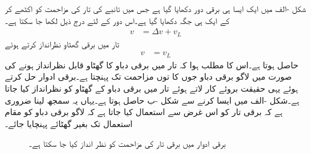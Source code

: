 شکل -الف میں ایک ایسا ہی برقی دور دکھایا گیا ہے جس  میں تانبے کی تار کی مزاحمت کو اکٹھے کر کے ایک ہی جگہ   دکھایا گیا ہے۔اس دور کے لئے درج ذیل لکھا جا سکتا ہے۔
\begin{align}
v&=\Delta v+v_L
\end{align}
تار میں برقی گھٹاو  نظرانداز کرتے ہوئے
\begin{align}
v&=v_L
\end{align}
حاصل ہوتا ہے۔اس کا مطلب ہوا کہ  تار میں برقی دباو کا گھٹاو قابل نظرانداز ہونے کی صورت میں لاگو برقی دباو جوں کا توں مزاحمت  تک پہنچتا ہے۔برقی ادوار حل کرتے ہوئے یہی حقیقت بروئے کار لاتے ہوئے تار میں برقی دباو کے گھٹاو کو نظرانداز کیا جاتا ہے۔شکل -الف میں ایسا کرنے سے  شکل -ب حاصل ہوتا ہے۔یہاں یہ سمجھ لینا ضروری ہے کہ برقی تار کو اس غرض سے استعمال کیا جاتا ہے کہ لاگو برقی دباو کو مقام استعمال تک بغیر گھٹائے پہنچایا جائے۔
\begin{figure}
\centering
\begin{subfigure}[b]{0.45\textwidth}
\centering
{}%
\caption{}
\end{subfigure}\hfill
\begin{subfigure}[b]{0.45\textwidth}
\centering
{}%
\caption{}
\end{subfigure}%
\caption{برقی ادوار میں برقی تار کی مزاحمت کو نظر انداز کیا جا سکتا ہے۔}
\label{شکل_مقناطیسی_دور_سلسہ_وار_مزاحمتی_ادوار}
\end{figure}%
